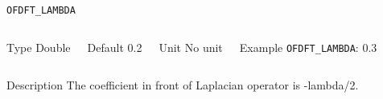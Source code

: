 \begin{frame}[allowframebreaks]{\texttt{OFDFT\_LAMBDA}} \label{OFDFT_LAMBDA}
\vspace*{-12pt}
\begin{columns}
\begin{block}{Type}
Double
\end{block}

\begin{block}{Default}
0.2
\end{block}

\begin{block}{Unit}
No unit
\end{block}

\begin{block}{Example}
\texttt{OFDFT\_LAMBDA}: 0.3
\end{block}
\end{columns}

\begin{block}{Description}
The coefficient in front of Laplacian operator is -lambda/2. 
\end{block}

\end{frame}
